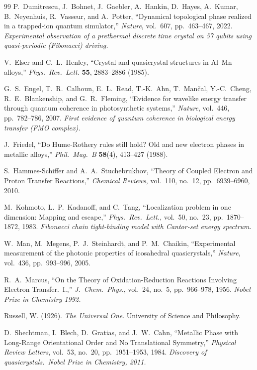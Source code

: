 \vspace{2em}
\begin{thebibliography}{99}
P.~Dumitrescu, J.~Bohnet, J.~Gaebler, A.~Hankin, D.~Hayes, A.~Kumar,
B.~Neyenhuis, R.~Vasseur, and A.~Potter,
``Dynamical topological phase realized in a trapped-ion quantum simulator,''
\emph{Nature}, vol.~607, pp.~463--467, 2022.
\textit{Experimental observation of a prethermal discrete time crystal on 57 qubits
using quasi-periodic (Fibonacci) driving.}

V.~Elser and C.~L.~Henley,
``Crystal and quasicrystal structures in Al--Mn alloys,''
\emph{Phys.~Rev.~Lett.} \textbf{55}, 2883--2886 (1985).

G.~S.~Engel, T.~R.~Calhoun, E.~L.~Read, T.-K.~Ahn, T.~Man\v{c}al, Y.-C.~Cheng,
R.~E.~Blankenship, and G.~R.~Fleming,
``Evidence for wavelike energy transfer through quantum coherence in photosynthetic systems,''
\emph{Nature}, vol.~446, pp.~782--786, 2007.
\textit{First evidence of quantum coherence in biological energy transfer (FMO complex).}

J.~Friedel,
``Do Hume-Rothery rules still hold? Old and new electron phases in metallic alloys,''
\emph{Phil.~Mag.~B} \textbf{58}(4), 413--427 (1988).

S.~Hammes-Schiffer and A.~A.~Stuchebrukhov,
``Theory of Coupled Electron and Proton Transfer Reactions,''
\emph{Chemical Reviews}, vol.~110, no.~12, pp.~6939--6960, 2010.

M.~Kohmoto, L.~P.~Kadanoff, and C.~Tang,
``Localization problem in one dimension: Mapping and escape,''
\emph{Phys.\ Rev.\ Lett.}, vol.~50, no.~23, pp.~1870--1872, 1983.
\textit{Fibonacci chain tight-binding model with Cantor-set energy spectrum.}

W.~Man, M.~Megens, P.~J.~Steinhardt, and P.~M.~Chaikin,
``Experimental measurement of the photonic properties of icosahedral quasicrystals,''
\emph{Nature}, vol.~436, pp.~993--996, 2005.

R.~A.~Marcus,
``On the Theory of Oxidation-Reduction Reactions Involving Electron Transfer.\ I.,''
\emph{J.\ Chem.\ Phys.}, vol.~24, no.~5, pp.~966--978, 1956.
\textit{Nobel Prize in Chemistry 1992.}

Russell, W. (1926).
\textit{The Universal One}. University of Science and Philosophy.

D.~Shechtman, I.~Blech, D.~Gratias, and J.~W.~Cahn,
``Metallic Phase with Long-Range Orientational Order and No Translational Symmetry,''
\emph{Physical Review Letters}, vol.~53, no.~20, pp.~1951--1953, 1984.
\textit{Discovery of quasicrystals.\ Nobel Prize in Chemistry, 2011.}


\end{thebibliography}
